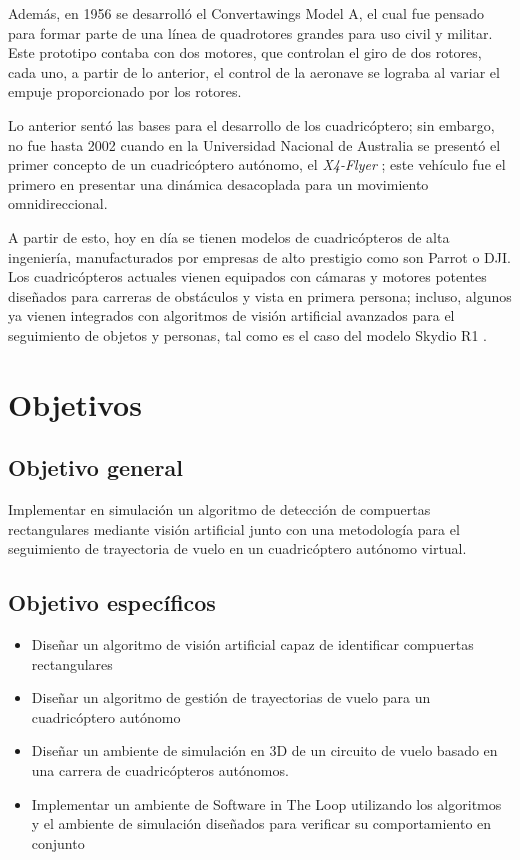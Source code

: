 Además, en 1956 se desarrolló el Convertawings Model A, el cual fue pensado para formar parte de una línea de quadrotores grandes para uso civil y militar. Este prototipo contaba con dos motores, que controlan el giro de dos rotores, cada uno, a partir de lo anterior, el control de la aeronave se lograba al variar el empuje proporcionado por los rotores.

Lo anterior sentó las bases para el desarrollo de los cuadricóptero; sin embargo, no fue hasta 2002 cuando en la Universidad Nacional de Australia se presentó el primer concepto de un cuadricóptero autónomo, el \textit{X4-Flyer} \cite{hamel2002dynamic}; este vehículo fue el primero en presentar una dinámica desacoplada para un movimiento omnidireccional.

A partir de esto, hoy en día se tienen modelos de cuadricópteros de alta ingeniería, manufacturados por empresas de alto prestigio como son Parrot o DJI. Los cuadricópteros actuales vienen equipados con cámaras y motores potentes diseñados para carreras de obstáculos y vista en primera persona; incluso, algunos ya vienen integrados con algoritmos de visión artificial avanzados para el seguimiento de objetos y personas, tal como es el caso del modelo Skydio R1 \cite{skydio}.




\section{Objetivos}
\subsection{Objetivo general}

Implementar en simulación un algoritmo de detección de compuertas rectangulares mediante visión artificial junto con una metodología para el seguimiento de trayectoria de vuelo en un cuadricóptero autónomo virtual.

\subsection{Objetivo específicos}

\begin{itemize}
    \item Diseñar un algoritmo de visión artificial capaz de identificar compuertas rectangulares 
    \item Diseñar un algoritmo de gestión de trayectorias de vuelo para un cuadricóptero autónomo 
    \item Diseñar un ambiente de simulación en 3D de un circuito de vuelo basado en una carrera de cuadricópteros autónomos. 
    \item Implementar un ambiente de Software in The Loop utilizando los algoritmos y el ambiente de simulación diseñados para verificar su comportamiento en conjunto 
\end{itemize}

